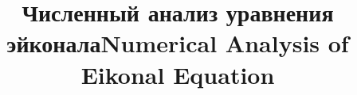 \begin{Russian}
  \title{Численный анализ уравнения эйконала}
\end{Russian}
\begin{English}
  \title{Numerical Analysis of Eikonal Equation}
\end{English}

